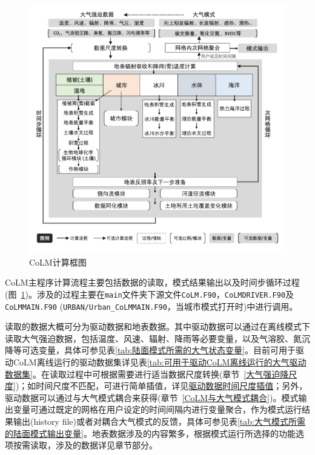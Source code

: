{
\begin{figure}[htbp]
\centering
\includegraphics[width=\textwidth]{Figures/模式构架/CoLM计算框图-v4.png}
\caption{CoLM计算框图}
\label{fig:CoLM计算框图}
\end{figure}
}

CoLM主程序计算流程主要包括数据的读取，模式结果输出以及时间步循环过程(图~\ref{fig:CoLM计算框图})。涉及的过程主要在\texttt{main}文件夹下源文件\texttt{CoLM.F90}，\texttt{CoLMDRIVER.F90}及\allowbreak \texttt{CoLMMAIN.F90}
\allowbreak (\texttt{URBAN\allowbreak /Urban\allowbreak \_CoLMMAIN.F90}，当城市模式打开时)中进行调用。

读取的数据大概可分为驱动数据和地表数据。其中驱动数据可以通过在离线模式下读取大气强迫数据，包括温度、风速、辐射、降雨等必要变量，以及气溶胶、氮沉降等可选变量，具体可参见表\ref{tab:陆面模式所需的大气状态变量}。目前可用于驱动CoLM离线运行的驱动数据集详见表\ref{tab:可用于驱动CoLM离线运行的大气驱动数据集}。在读取过程中可根据需要进行适当数据尺度转换(章节~\ref{大气强迫降尺度})；如时间尺度不匹配，可进行简单插值，详见\hyperlink{驱动数据时间尺度插值}{驱动数据时间尺度插值}；另外，驱动数据可以通过与大气模式耦合来获得(章节~\ref{CoLM与大气模式耦合})。模式输出变量可通过既定的网格在用户设定的时间间隔内进行变量聚合，作为模式运行结果输出(history
file)或者对耦合大气模式的反馈，具体可参见表\ref{tab:大气模式所需的陆面模式输出变量}。地表数据涉及的内容繁多，根据模式运行所选择的功能选项按需读取，涉及的数据详见章节部分。

